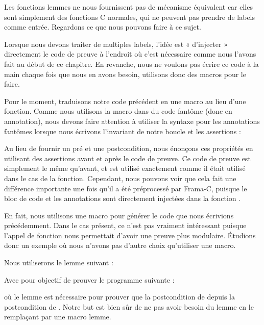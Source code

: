 Les fonctions lemmes ne nous fournissent pas de mécanisme équivalent
car elles sont simplement des fonctions C normales, qui ne peuvent pas prendre
de labels comme entrée. Regardons ce que nous pouvons faire à ce sujet.





Lorsque nous devons traiter de multiples labels, l'idée est « d'injecter »
directement le code de preuve à l'endroit où c'est nécessaire comme nous
l'avons fait au début de ce chapitre. En revanche, nous ne voulons pas écrire
ce code à la main chaque fois que nous en avons besoin, utilisons donc des
macros pour le faire.


Pour le moment, traduisons notre code précédent en une macro au lieu d'une
fonction. Comme nous utilisons la macro dans du code fantôme (donc en annotation),
nous devons faire attention à utiliser la syntaxe pour les annotations fantômes
lorsque nous écrivons l'invariant de notre boucle et les assertions :




Au lieu de fournir un pré et une postcondition, nous énonçons ces propriétés en
utilisant des assertions avant et après le code de preuve. Ce code de preuve est
simplement le même qu'avant, et est utilisé exactement comme il était utilisé dans
le cas de la fonction. Cependant, nous pouvons voir que cela fait une différence
importante une fois qu'il a été préprocessé par Frama-C, puisque le bloc de code
et les annotations sont directement injectées dans la fonction
.




En fait, nous utilisons une macro pour générer le code que nous écrivions
précédemment. Dans le cas présent, ce n'est pas vraiment intéressant puisque
l'appel de fonction nous permettait d'avoir une preuve plus modulaire. Étudions
donc un exemple où nous n'avons pas d'autre choix qu'utiliser une macro.


Nous utiliserons le lemme suivant :




Avec pour objectif de prouver le programme suivante :




où le lemme  est nécessaire pour prouver que la
postcondition de  depuis la postcondition de
. Notre but est bien sûr de ne pas avoir besoin du
lemme en le remplaçant par une macro lemme.


